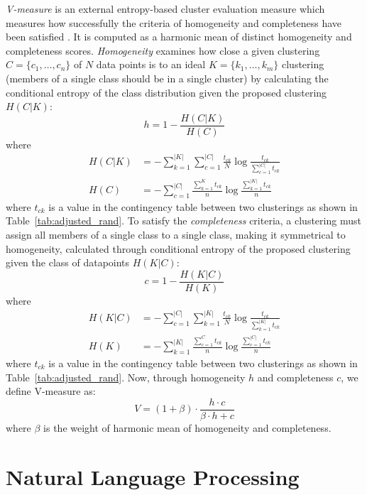 \textit{V-measure} is an external entropy-based cluster evaluation measure
which measures how successfully the criteria of homogeneity and completeness
have been satisfied \citep{rosenberg2007v}.
It is computed as a harmonic mean of distinct homogeneity and completeness scores. 
\textit{Homogeneity} examines how close a given clustering $C = \{c_1, \dots, c_n\}$ of 
$N$ data points is to an ideal $K = \{k_1, \dots, k_m\}$ clustering (members of a single
class should be in a single cluster) by calculating the 
conditional entropy of the class distribution given the proposed clustering 
$H(C | K)$:
$$
h = 1 - \frac{H(C | K)}{H(C)}
$$
where 
\begin{align*} 
	H(C | K) &= - \sum_{k=1}^{|K|}\sum_{c=1}^{|C|} \frac{t_{ck}}{N}\log \frac{t_{ck}}{\sum_{c=1}^{|C|} t_{ck}} \\
	H(C) &= - \sum_{c=1}^{|C|} \frac{\sum_{k=1}^{K} t_{ck}}{n} \log \frac{\sum_{k=1}^{|K|} t_{ck}}{n}
\end{align*}
where $t_{ck}$ is a value in the contingency table between two clusterings as shown in 
Table~\ref{tab:adjusted_rand}.
To satisfy the \textit{completeness} criteria, a clustering must assign all 
members of a single class to a single class, making it symmetrical to 
homogeneity, calculated through conditional entropy of the proposed clustering
given the class of datapoints $H(K | C)$:
$$
c = 1 - \frac{H(K | C)}{H(K)}
$$
where
\begin{align*}
H(K | C) &= - \sum_{c=1}^{|C|}\sum_{k=1}^{|K|} \frac{t_{ck}}{N} \log \frac{t_{ck}}{\sum_{k=1}^{|K|} t_{ck}} \\
H(K) &= - \sum_{k=1}^{|K|} \frac{\sum_{c=1}^{C} t_{ck}}{n} \log \frac{\sum_{c=1}^{|C|} t_{ck}}{n}
\end{align*}
where $t_{ck}$ is a value in the contingency table between two clusterings as shown in 
Table~\ref{tab:adjusted_rand}.
Now, through homogeneity $h$ and completeness $c$, we define V-measure as:
\begin{equation}\label{eq:v-measure}
	V = (1 + \beta) \cdot \frac{h \cdot c}{\beta \cdot h + c}
\end{equation}
where $\beta$ is the weight of harmonic mean of homogeneity and completeness.


\pagebreak
\section{Natural Language Processing}
\label{sec:natural_language_processing}

